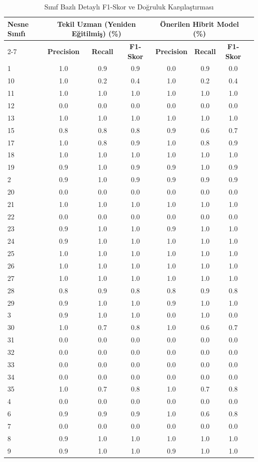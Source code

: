 \begin{table}[htbp]
\caption{Sınıf Bazlı Detaylı F1-Skor ve Doğruluk Karşılaştırması}
\label{tab:class_breakdown}
\centering
\begin{tabular}{lccccccc}
\hline
\textbf{Nesne Sınıfı} & \multicolumn{3}{c}{\textbf{Tekil Uzman (Yeniden Eğitilmiş) (\%)}} & \multicolumn{3}{c}{\textbf{Önerilen Hibrit Model (\%)}} \\ \cline{2-7} 
 & \textbf{Precision} & \textbf{Recall} & \textbf{F1-Skor} & \textbf{Precision} & \textbf{Recall} & \textbf{F1-Skor} \\ \hline
1 & 1.0 & 0.9 & 0.9 & 0.0 & 0.9 & 0.0 \\
10 & 1.0 & 0.2 & 0.4 & 1.0 & 0.2 & 0.4 \\
11 & 1.0 & 1.0 & 1.0 & 1.0 & 1.0 & 1.0 \\
12 & 0.0 & 0.0 & 0.0 & 0.0 & 0.0 & 0.0 \\
13 & 1.0 & 1.0 & 1.0 & 1.0 & 1.0 & 1.0 \\
15 & 0.8 & 0.8 & 0.8 & 0.9 & 0.6 & 0.7 \\
17 & 1.0 & 0.8 & 0.9 & 1.0 & 0.8 & 0.9 \\
18 & 1.0 & 1.0 & 1.0 & 1.0 & 1.0 & 1.0 \\
19 & 0.9 & 1.0 & 0.9 & 0.9 & 1.0 & 0.9 \\
2 & 0.9 & 1.0 & 0.9 & 0.9 & 0.9 & 0.9 \\
20 & 0.0 & 0.0 & 0.0 & 0.0 & 0.0 & 0.0 \\
21 & 1.0 & 1.0 & 1.0 & 1.0 & 1.0 & 1.0 \\
22 & 0.0 & 0.0 & 0.0 & 0.0 & 0.0 & 0.0 \\
23 & 0.9 & 1.0 & 1.0 & 0.9 & 1.0 & 1.0 \\
24 & 0.9 & 1.0 & 1.0 & 1.0 & 1.0 & 1.0 \\
25 & 1.0 & 1.0 & 1.0 & 1.0 & 1.0 & 1.0 \\
26 & 1.0 & 1.0 & 1.0 & 1.0 & 1.0 & 1.0 \\
27 & 1.0 & 1.0 & 1.0 & 1.0 & 1.0 & 1.0 \\
28 & 0.8 & 0.9 & 0.8 & 0.8 & 0.9 & 0.8 \\
29 & 0.9 & 1.0 & 1.0 & 0.9 & 1.0 & 1.0 \\
3 & 0.9 & 1.0 & 1.0 & 0.0 & 1.0 & 0.0 \\
30 & 1.0 & 0.7 & 0.8 & 1.0 & 0.6 & 0.7 \\
31 & 0.0 & 0.0 & 0.0 & 0.0 & 0.0 & 0.0 \\
32 & 0.0 & 0.0 & 0.0 & 0.0 & 0.0 & 0.0 \\
33 & 0.0 & 0.0 & 0.0 & 0.0 & 0.0 & 0.0 \\
34 & 0.0 & 0.0 & 0.0 & 0.0 & 0.0 & 0.0 \\
35 & 1.0 & 0.7 & 0.8 & 1.0 & 0.7 & 0.8 \\
4 & 0.0 & 0.0 & 0.0 & 0.0 & 0.0 & 0.0 \\
6 & 0.9 & 0.9 & 0.9 & 1.0 & 0.6 & 0.8 \\
7 & 0.0 & 0.0 & 0.0 & 0.0 & 0.0 & 0.0 \\
8 & 0.9 & 1.0 & 1.0 & 1.0 & 1.0 & 1.0 \\
9 & 0.9 & 1.0 & 1.0 & 0.9 & 1.0 & 1.0 \\
\hline
\end{tabular}
\end{table}
